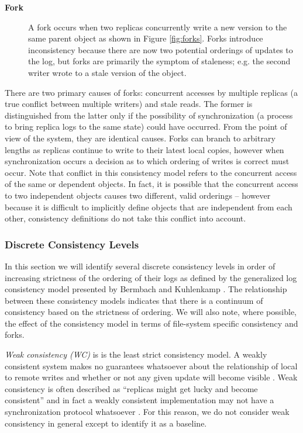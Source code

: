 \documentclass{article}
\begin{document}
\begin{description}
    \item[\textbf{Fork}] A fork occurs when two replicas concurrently write a new version to the same parent object as shown in Figure \ref{fig:forks}. Forks introduce inconsistency because there are now two potential orderings of updates to the log, but forks are primarily the symptom of staleness; e.g. the second writer wrote to a stale version of the object.
\end{description}

There are two primary causes of forks: concurrent accesses by multiple replicas (a true conflict between multiple writers) and stale reads. The former is distinguished from the latter only if the possibility of synchronization (a process to bring replica logs to the same state) could have occurred. From the point of view of the system, they are identical causes. Forks can branch to arbitrary lengths as replicas continue to write to their latest local copies, however when synchronization occurs a decision as to which ordering of writes is correct must occur. Note that conflict in this consistency model refers to the concurrent access of the same or dependent objects. In fact, it is possible that the concurrent access to two independent objects causes two different, valid orderings -- however because it is difficult to implicitly define objects that are independent from each other, consistency definitions do not take this conflict into account.

\subsubsection{Discrete Consistency Levels}

In this section we will identify several discrete consistency levels in order of increasing strictness of the ordering of their logs as defined by the generalized log consistency model presented by Bermbach and Kuhlenkamp \cite{bermbach_consistency_2013}. The relationship between these consistency models indicates that there is a continuum of consistency based on the strictness of ordering. We will also note, where possible, the effect of the consistency model in terms of file-system specific consistency and forks.

\textit{Weak consistency (WC)} is is the least strict consistency model.
A weakly consistent system makes no guarantees whatsoever about the relationship of local to remote writes and whether or not any given update will become visible \cite{vogels_eventually_2009}. Weak consistency is often described as ``replicas might get lucky and become consistent'' and in fact a weakly consistent implementation may not have a synchronization protocol whatsoever \cite{bermbach_consistency_2013}. For this reason, we do not consider weak consistency in general except to identify it as a baseline.
\end{document}
